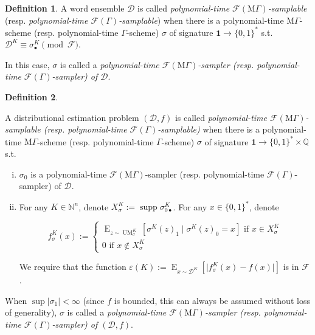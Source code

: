 \documentclass{article}
\numberwithin{equation}{section}
\theoremstyle{definition}
\newtheorem{definition}{Definition}[section]
\theoremstyle{plain}
\newcommand{\Bool}{\{0,1\}}
\newcommand{\Words}{{\Bool^*}}
\DeclareMathOperator{\Supp}{supp}
\DeclareMathOperator{\E}{E}
\DeclareMathOperator{\UM}{UM}
\newcommand{\Nats}{\mathbb{N}}
\newcommand{\Rats}{\mathbb{Q}}
\newcommand{\Abs}[1]{\lvert #1 \rvert}
\newcommand{\Dist}{\mathcal{D}}
\newcommand{\MGrow}{\mathrm{M}\Gamma}
\newcommand{\Fall}{\mathcal{F}}
\newcommand{\EG}{\Fall(\Gamma)}
\newcommand{\EMG}{\Fall(\MGrow)}
\begin{document}
\begin{samepage}
\begin{definition}

A word ensemble $\Dist$ is called \emph{polynomial-time $\EMG$-samplable} (resp. \emph{polynomial-time $\EG$-samplable}) when there is a polynomial-time $\MGrow$-scheme (resp. polynomial-time $\Gamma$-scheme) $\sigma$ of signature ${\bm{1} \rightarrow \Words}$  s.t. $\Dist^{K} \equiv \sigma_\bullet^K \pmod \Fall$.

In this case, $\sigma$ is called a \emph{polynomial-time $\EMG$-sampler (resp. polynomial-time $\EG$-sampler) of $\Dist$}.

\end{definition}
\end{samepage}

\begin{samepage}
\begin{definition}
\label{def:smp_prob}

A distributional estimation problem $(\Dist,f)$ is called \emph{polynomial-time $\EMG$-samplable (resp. polynomial-time $\EG$-samplable)} when there is a polynomial-time $\MGrow$-scheme (resp. polynomial-time $\Gamma$-scheme) $\sigma$ of signature $\bm{1} \rightarrow \Words \times \Rats$ s.t. 

\begin{enumerate}[(i)]

\item $\sigma_0$ is a polynomial-time $\EMG$-sampler (resp. polynomial-time $\EG$-sampler) of $\Dist$.

\item For any $K \in \Nats^n$, denote $X_{\sigma}^K:=\Supp \sigma_{0\bullet}^K$. For any $x \in \Words$, denote 

$$f_\sigma^K(x):=\begin{cases}\E_{z \sim\UM_\sigma^K}[\sigma^K(z)_1 \mid \sigma^K(z)_0 = x] \text{ if } x \in X_{\sigma}^K \\ 0 \text{ if } x \not\in X_{\sigma}^K \end{cases}$$

We require that the function $\varepsilon(K):=\E_{x \sim \Dist^{K}}[\Abs{f_\sigma^K(x)-f(x)}]$ is in $\Fall$.

\end{enumerate}

When $\sup{\Abs{\sigma_1}} < \infty$ (since $f$ is bounded, this can always be assumed without loss of generality), $\sigma$ is called a \emph{polynomial-time $\EMG$-sampler (resp. polynomial-time $\EG$-sampler) of $(\Dist,f)$}.

\end{definition}
\end{samepage}
\end{document}
